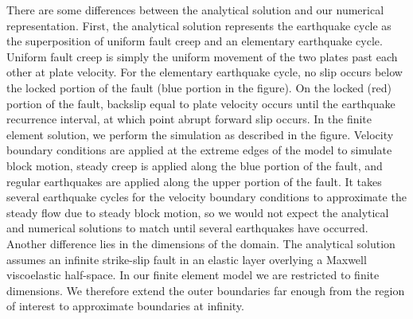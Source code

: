 There are some differences between the analytical solution and our
numerical representation. First, the analytical solution represents
the earthquake cycle as the superposition of uniform fault creep and
an elementary earthquake cycle. Uniform fault creep is simply the
uniform movement of the two plates past each other at plate velocity.
For the elementary earthquake cycle, no slip occurs below the locked
portion of the fault (blue portion in the figure). On the locked (red)
portion of the fault, backslip equal to plate velocity occurs until
the earthquake recurrence interval, at which point abrupt forward
slip occurs. In the finite element solution, we perform the simulation
as described in the figure. Velocity boundary conditions are applied
at the extreme edges of the model to simulate block motion, steady
creep is applied along the blue portion of the fault, and regular
earthquakes are applied along the upper portion of the fault. It takes
several earthquake cycles for the velocity boundary conditions to
approximate the steady flow due to steady block motion, so we would
not expect the analytical and numerical solutions to match until several
earthquakes have occurred. Another difference lies in the dimensions
of the domain. The analytical solution assumes an infinite strike-slip
fault in an elastic layer overlying a Maxwell viscoelastic half-space.
In our finite element model we are restricted to finite dimensions.
We therefore extend the outer boundaries far enough from the region
of interest to approximate boundaries at infinity.

